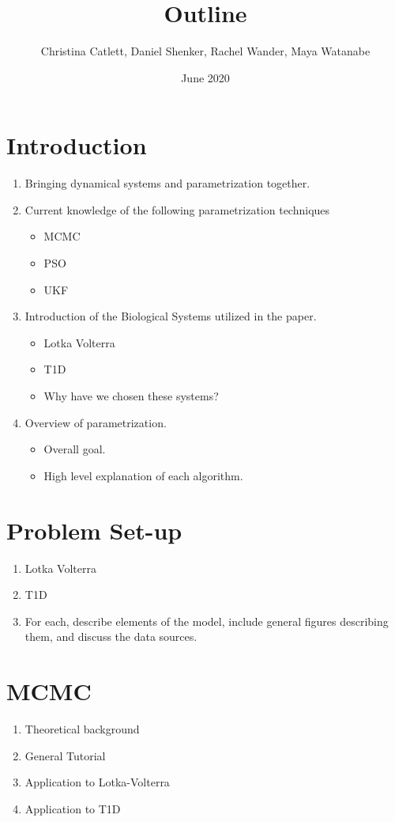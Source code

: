 \documentclass{article}
\title{Outline}
\author{Christina Catlett, Daniel Shenker, Rachel Wander, Maya Watanabe}
\date{June 2020}
\begin{document}
\maketitle

\section{Introduction}
\begin{enumerate}
    \item Bringing dynamical systems and parametrization together.
    \item Current knowledge of the following parametrization techniques
    \begin{itemize}
        \item MCMC
        \item PSO
        \item UKF
    \end{itemize}
    \item Introduction of the Biological Systems utilized in the paper.
    \begin{itemize}
        \item Lotka Volterra
        \item T1D
        \item Why have we chosen these systems?
    \end{itemize}
    \item Overview of parametrization.
    \begin{itemize}
        \item Overall goal.
        \item High level explanation of each algorithm.
    \end{itemize}
    
\end{enumerate}

\section{Problem Set-up}
\begin{enumerate}
    \item Lotka Volterra
    \item T1D
    \item For each, describe elements of the model, include general figures describing them, and discuss the data sources.
\end{enumerate}

\section{MCMC}
\begin{enumerate}
    \item Theoretical background
    \item General Tutorial
    \item Application to Lotka-Volterra
    \item Application to T1D
\end{enumerate}
\end{document}
